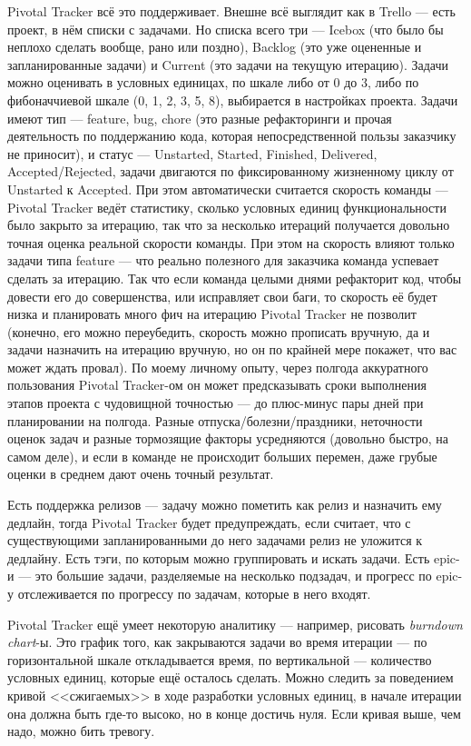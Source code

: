 \documentclass[a5paper]{article}
\begin{document}
Pivotal Tracker всё это поддерживает. Внешне всё выглядит как в Trello --- есть проект, в нём списки с задачами. Но списка всего три --- Icebox (что было бы неплохо сделать вообще, рано или поздно), Backlog (это уже оцененные и запланированные задачи) и Current (это задачи на текущую итерацию). Задачи можно оценивать в условных единицах, по шкале либо от 0 до 3, либо по фибоначчиевой шкале (0, 1, 2, 3, 5, 8), выбирается в настройках проекта. Задачи имеют тип --- feature, bug, chore (это разные рефакторинги и прочая деятельность по поддержанию кода, которая непосредственной пользы заказчику не приносит), и статус --- Unstarted, Started, Finished, Delivered, Accepted/Rejected, задачи двигаются по фиксированному жизненному циклу от Unstarted к Accepted. При этом автоматически считается скорость команды --- Pivotal Tracker ведёт статистику, сколько условных единиц функциональности было закрыто за итерацию, так что за несколько итераций получается довольно точная оценка реальной скорости команды. При этом на скорость влияют только задачи типа feature --- что реально полезного для заказчика команда успевает сделать за итерацию. Так что если команда целыми днями рефакторит код, чтобы довести его до совершенства, или исправляет свои баги, то скорость её будет низка и планировать много фич на итерацию Pivotal Tracker не позволит (конечно, его можно переубедить, скорость можно прописать вручную, да и задачи назначить на итерацию вручную, но он по крайней мере покажет, что вас может ждать провал). По моему личному опыту, через полгода аккуратного пользования Pivotal Tracker-ом он может предсказывать сроки выполнения этапов проекта с чудовищной точностью --- до плюс-минус пары дней при планировании на полгода. Разные отпуска/болезни/праздники, неточности оценок задач и разные тормозящие факторы усредняются (довольно быстро, на самом деле), и если в команде не происходит больших перемен, даже грубые оценки в среднем дают очень точный результат.

Есть поддержка релизов --- задачу можно пометить как релиз и назначить ему дедлайн, тогда Pivotal Tracker будет предупреждать, если считает, что с существующими запланированными до него задачами релиз не уложится к дедлайну. Есть тэги, по которым можно группировать и искать задачи. Есть epic-и --- это большие задачи, разделяемые на несколько подзадач, и прогресс по epic-у отслеживается по прогрессу по задачам, которые в него входят.

Pivotal Tracker ещё умеет некоторую аналитику --- например, рисовать \textit{burndown chart}-ы. Это график того, как закрываются задачи во время итерации --- по горизонтальной шкале откладывается время, по вертикальной --- количество условных единиц, которые ещё осталось сделать. Можно следить за поведением кривой <<сжигаемых>> в ходе разработки условных единиц, в начале итерации она должна быть где-то высоко, но в конце достичь нуля. Если кривая выше, чем надо, можно бить тревогу.
\end{document}
